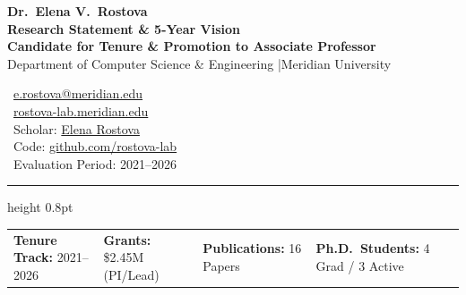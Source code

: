 \documentclass[11pt, a4paper, parskip=half]{scrartcl}
\begin{document}
\begin{summarybox}
  \begin{minipage}[t]{0.62\textwidth}
    {\sffamily\Huge\bfseries\color{PrimaryNavy} Dr.~Elena V.~Rostova} \\[0.2em]
    {\sffamily\Large\bfseries\color{SecondaryTeal} Research Statement \& 5-Year Vision} \\[0.3em]
    {\sffamily\bfseries Candidate for Tenure \& Promotion to Associate Professor} \\
    {\small Department of Computer Science \& Engineering \quad|\quad Meridian University}
  \end{minipage}%
  \hfill
  \begin{minipage}[t]{0.35\textwidth}
    \small\sffamily
    \raggedleft
    \textcolor{PrimaryNavy}{\faEnvelope} \ \href{mailto:e.rostova@meridian.edu}{e.rostova@meridian.edu} \\
    \textcolor{PrimaryNavy}{\faGlobe} \ \href{https://rostova-lab.meridian.edu}{rostova-lab.meridian.edu} \\
    \textcolor{PrimaryNavy}{\faGraduationCap} \ Scholar: \href{https://scholar.google.com}{Elena Rostova} \\
    \textcolor{PrimaryNavy}{\faCodeBranch} \ Code: \href{https://github.com/rostova-lab}{github.com/rostova-lab} \\
    \textcolor{PrimaryNavy}{\faCalendar} \ Evaluation Period: 2021--2026
  \end{minipage}
  
  \vspace{0.3em}
  \hrule height 0.8pt \relax
  \vspace{0.3em}
  
  \begin{minipage}[t]{\textwidth}
    \sffamily\small
    \begin{tabularx}{\textwidth}{@{} X X X X @{}}
      \textcolor{PrimaryNavy}{\textbf{Tenure Track:}} 2021--2026 &
      \textcolor{PrimaryNavy}{\textbf{Grants:}} \$2.45M (PI/Lead) &
      \textcolor{PrimaryNavy}{\textbf{Publications:}} 16 Papers &
      \textcolor{PrimaryNavy}{\textbf{Ph.D.\ Students:}} 4 Grad / 3 Active
    \end{tabularx}
  \end{minipage}
\end{summarybox}
\end{document}
